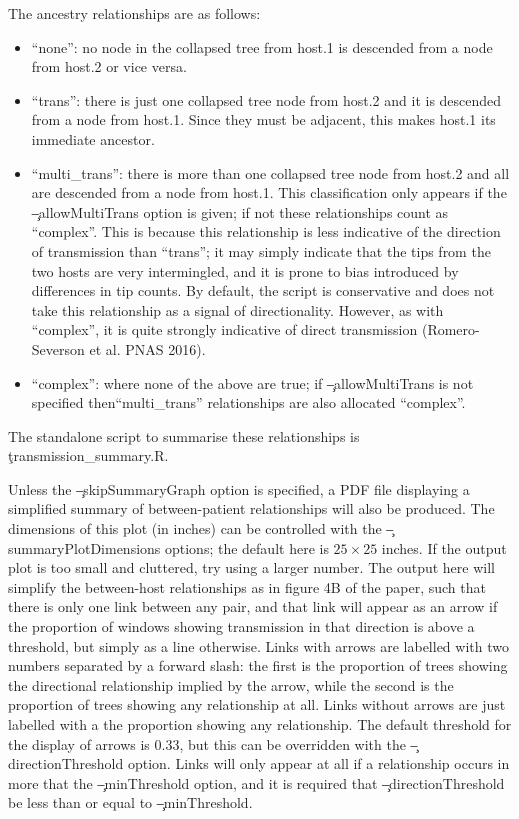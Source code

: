 The ancestry relationships are as follows:
\begin{itemize}
\item ``none'': no node in the collapsed tree from host.1 is descended from a node from host.2 or vice versa.
\item ``trans'': there is just one collapsed tree node from host.2 and it is descended from a node from host.1.
Since they must be adjacent, this makes host.1 its immediate ancestor.
\item ``multi\_trans'': there is more than one collapsed tree node from host.2 and all are descended from a node from host.1.
This classification only appears if the \c{--allowMultiTrans} option is given; if not these relationships count as ``complex''.
This is because this relationship is less indicative of the direction of transmission than ``trans''; it may simply indicate that the tips from the two hosts are very intermingled, and it is prone to bias introduced by differences in tip counts.
By default, the script is conservative and does not take this relationship as a signal of directionality.
However, as with ``complex'', it is quite strongly indicative of direct transmission (Romero-Severson et al. PNAS 2016).
\item ``complex'': where none of the above are true; if \c{--allowMultiTrans} is not specified then\break ``multi\_trans'' relationships are also allocated ``complex''.
\end{itemize}
The standalone script to summarise these relationships is \c{transmission\_summary.R}.

Unless the \c{--skipSummaryGraph} option is specified, a PDF file displaying a simplified summary of between-patient relationships will also be produced. The dimensions of this plot (in inches) can be controlled with the \c{--summaryPlotDimensions} options; the default here is $25\times25$ inches. If the output plot is too small and cluttered, try using a larger number. The output here will simplify the between-host relationships as in figure 4B of the \p paper, such that there is only one link between any pair, and that link will appear as an arrow if the proportion of windows showing transmission in that direction is above a threshold, but simply as a line otherwise. Links with arrows are labelled with two numbers separated by a forward slash: the first is the proportion of trees showing the directional relationship implied by the arrow, while the second is the proportion of trees showing any relationship at all. Links without arrows are just labelled with a the proportion showing any relationship. The default threshold for the display of arrows is 0.33, but this can be overridden with the \c{--directionThreshold} option. Links will only appear at all if a relationship occurs in more that the \c{--minThreshold} option, and it is required that \c{--directionThreshold} be less than or equal to \c{--minThreshold}.

